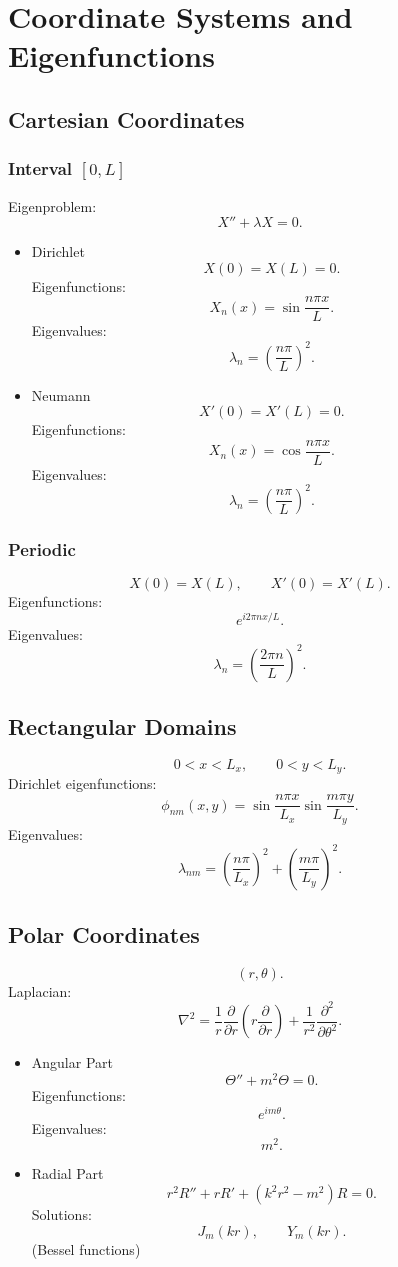 \documentclass[aps,prl,twocolumn,groupedaddress]{revtex4-2}
\begin{document}
\section{Coordinate Systems and Eigenfunctions}

\subsection{Cartesian Coordinates}

\subsubsection{Interval $[0,L]$}

Eigenproblem:
$$
X''+\lambda X=0.
$$

\begin{itemize}
\item Dirichlet
$$
X(0)=X(L)=0.
$$
Eigenfunctions:
$$
X_n(x)
=
\sin\frac{n\pi x}{L}.
$$
Eigenvalues:
$$
\lambda_n
=
\left(\frac{n\pi}{L}\right)^2.
$$
\item Neumann
$$
X'(0)=X'(L)=0.
$$
Eigenfunctions:
$$
X_n(x)
=
\cos\frac{n\pi x}{L}.
$$
Eigenvalues:
$$
\lambda_n
=
\left(\frac{n\pi}{L}\right)^2.
$$
\end{itemize}

\subsubsection{Periodic}

$$
X(0)=X(L),
\qquad
X'(0)=X'(L).
$$
Eigenfunctions:
$$
e^{i2\pi nx/L}.
$$
Eigenvalues:
$$
\lambda_n
=
\left(\frac{2\pi n}{L}\right)^2.
$$

\subsection{Rectangular Domains}

$$
0<x<L_x,
\qquad
0<y<L_y.
$$
Dirichlet eigenfunctions:
$$
\phi_{nm}(x,y)
=
\sin\frac{n\pi x}{L_x}
\sin\frac{m\pi y}{L_y}.
$$
Eigenvalues:
$$
\lambda_{nm}
=
\left(\frac{n\pi}{L_x}\right)^2
+
\left(\frac{m\pi}{L_y}\right)^2.
$$

\subsection{Polar Coordinates}

$$
(r,\theta).
$$
Laplacian:
$$
\nabla^2
=
\frac1r
\frac{\partial}{\partial r}
\left(
r\frac{\partial}{\partial r}
\right)
+
\frac1{r^2}
\frac{\partial^2}{\partial\theta^2}.
$$
\begin{itemize}
\item Angular Part
$$
\Theta''+m^2\Theta=0.
$$
Eigenfunctions:
$$
e^{im\theta}.
$$
Eigenvalues:
$$
m^2.
$$

\item Radial Part
$$
r^2R''
+rR'
+
(k^2r^2-m^2)R
=
0.
$$
Solutions:
$$
J_m(kr),
\qquad
Y_m(kr).
$$
(Bessel functions)
\end{itemize}
\end{document}
